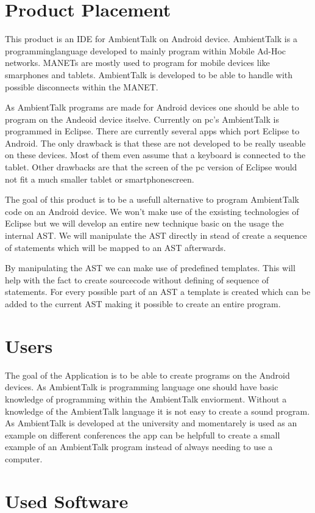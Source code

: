 \documentclass[a4paper,12pt]{report}
\begin{document}
\section{Product Placement}
This product is an IDE for AmbientTalk on Android device. AmbientTalk is a programminglanguage developed to mainly program within Mobile Ad-Hoc networks. MANETs are mostly used to program
for mobile devices like smarphones and tablets. AmbientTalk is developed to be able to handle with possible disconnects within the MANET.

As AmbientTalk programs are made for Android devices one should be able to program on the Andeoid device itselve. Currently on pc's AmbientTalk is programmed in Eclipse. There are currently
several apps which port Eclipse to Android. The only drawback is that these are not developed to be really useable on these devices. Most of them even assume that a keyboard is connected to the
tablet. Other drawbacks are that the screen of the pc version of Eclipse would not fit a much smaller tablet or smartphonescreen.   

The goal of this product is to be a usefull alternative to program AmbientTalk code on an Android device. We won't make use of the exsisting technologies of Eclipse but we will develop an entire
new technique basic on the usage the internal AST. We will manipulate the AST directly in stead of create a sequence of statements which will be mapped to an AST afterwards.

By manipulating the AST we can make use of predefined templates. This will help with the fact to create sourcecode without defining of sequence of statements. For every possible part of an AST
a template is created which can be added to the current AST making it possible to create an entire program. 
\section{Users}
The goal of the Application is to be able to create programs on the Android devices. As AmbientTalk is programming language one should have basic knowledge of programming within the AmbientTalk
enviorment. Without a knowledge of the AmbientTalk language it is not easy to create a sound program.
As AmbientTalk is developed at the university and momentarely is used as an example on different conferences the app can be helpfull to create a small example of an AmbientTalk program instead 
of always needing to use a computer.

\section{Used Software}
\end{document}
